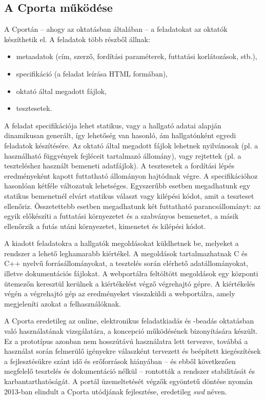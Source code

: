 \subsection{A Cporta működése}
A Cportán -- ahogy az oktatásban általában -- a feladatokat az oktatók készíthetik el.
A feladatok több részből állnak:
\begin{itemize}
    \item metaadatok (cím, szerző, fordítási paraméterek, futtatási korlátozások, stb.),
    \item specifikáció (a feladat leírása HTML formában),
    \item oktató által megadott fájlok,
    \item tesztesetek.
\end{itemize}
A feladat specifikációja lehet statikus, vagy a hallgató adatai alapján dinamikusan generált, így lehetőség van hasonló, ám hallgatónként egyedi feladatok készítésére.
Az oktató által megadott fájlok lehetnek nyilvánosak (pl. a használható függvények fejléceit tartalmazó állomány), vagy rejtettek (pl. a teszteléshez használt bemeneti adatfájlok).
A tesztesetek a fordítási lépés eredményeként kapott futtatható állományon hajtódnak végre.
A specifikációhoz hasonlóan kétféle változatuk lehetséges.
Egyszerűbb esetben megadhatunk egy statikus bemenetnél elvárt statikus választ vagy kilépési kódot, amit a teszteset ellenőriz.
Összetettebb esetben megadhatunk két futtatható parancsállományt: az egyik előkészíti a futtatási környezetet és a szabványos bemenetet, a másik ellenőrzik a futás utáni környezetet, kimenetet és kilépési kódot.
\cite{Ory13}

A kiadott feladatokra a hallgatók megoldásokat küldhetnek be, melyeket a rendszer a lehető leghamarabb kiértékel.
A megoldások tartalmazhatnak C és C++ nyelvű forrásállományokat, a tesztelés során elérhető adatállományokat, illetve dokumentációs fájlokat.
A webportálra feltöltött megoldások egy központi ütemezőn keresztül kerülnek a kiértékelést végző végrehajtó gépre.
A kiértékelés végén a végrehajtó gép az eredményeket visszaküldi a webportálra, amely megjeleníti azokat a felhasználóknak. 

A Cporta eredetileg az online, elektronikus feladatkiadás és -beadás oktatásban való használatának vizsgálatára, a koncepció működésének bizonyítására készült.
Ez a prototípus azonban nem hosszútávú használatra lett tervezve, továbbá a használat során felmerülő igényekre válaszként tervezett és beépített kiegészítések a fejlesztésükre szánt idő és erőforrások hiányában -- és ebből következően megfelelő tesztelés és dokumentáció nélkül -- rontották a rendszer stabilitását és karbantarthatóságát.  
A portál üzemeltetését végzők egyöntetű döntése nyomán 2013-ban elindult a Cporta utódjának fejlesztése, eredetileg \textit{swd} néven.


